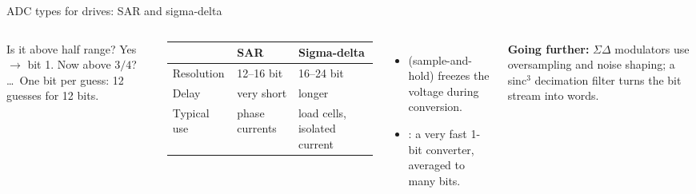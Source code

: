 \documentclass[aspectratio=169,10pt]{beamer}
\newcommand{\gofurther}[1]{{\footnotesize\color{mkGray}\textbf{\color{mkMid}Going further:} #1}}
\begin{document}
\begin{frame}{ADC types for drives: SAR and sigma-delta}
\begin{columns}[T]
\centering
{}

\vspace{2mm}
\begin{keybox}[SAR = ``guess the number'']
\small Is it above half range? Yes $\to$ bit 1. Now above $3/4$? \dots\ One bit per guess: 12 guesses for 12 bits.
\end{keybox}
\small
\renewcommand{\arraystretch}{1.12}
\begin{tabularx}{\linewidth}{@{}l X X@{}}
\toprule
 & \textbf{SAR} & \textbf{Sigma-delta}\\
\midrule
Resolution & 12--16 bit & 16--24 bit\\
Delay & \textcolor{mkGreen}{very short} & \textcolor{mkRed}{longer}\\
Typical use & phase currents & load cells, isolated current\\
\bottomrule
\end{tabularx}

\vspace{2mm}
\begin{itemize}\small
\item {} (sample-and-hold) freezes the voltage during conversion.
\item {}: a very fast 1-bit converter, averaged to many bits.
\end{itemize}
\gofurther{$\Sigma\Delta$ modulators use oversampling and noise shaping; a sinc$^3$ decimation filter turns the bit stream into words.}
\end{columns}
\end{frame}
\end{document}
